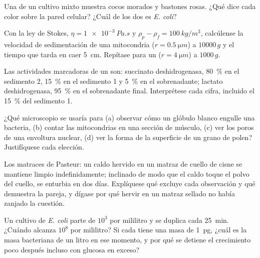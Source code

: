 \begin{exercise}[$\star\star$]\label{exo:b1:cell-unit-of-life:6}
Una  de un cultivo mixto muestra cocos morados y bastones
rosas. ¿Qué dice cada color sobre la pared celular? ¿Cuál de los dos es
\emph{E. coli}?
\end{exercise}

\begin{exercise}[$\star\star$]\label{exo:b1:cell-unit-of-life:7}
Con la ley de Stokes, $\eta = \qty{1e-3}{Pa.s}$ y $\rho_p - \rho_f =
\qty{100}{kg/m^3}$, calcúlense la velocidad de sedimentación de una
mitocondria ($r = \qty{0.5}{\micro m}$) a $\num{10000}\,g$ y el tiempo que
tarda en caer \qty{5}{cm}. Repítase para un 
($r = \qty{4}{\micro m}$) a $1000\,g$.
\end{exercise}

\begin{exercise}[$\star\star$]\label{exo:b1:cell-unit-of-life:8}
Las actividades marcadoras de un  son: succinato
deshidrogenasa, \qty{80}{\%} en el sedimento 2, \qty{15}{\%} en el
sedimento 1 y \qty{5}{\%} en el sobrenadante; lactato deshidrogenasa,
\qty{95}{\%} en el sobrenadante final. Interprétese cada cifra, incluido el
\qty{15}{\%} del sedimento 1.
\end{exercise}

\begin{exercise}[$\star\star$]\label{exo:b1:cell-unit-of-life:9}
¿Qué microscopio se usaría para (a) observar cómo un glóbulo blanco engulle
una bacteria, (b) contar las mitocondrias en una sección de músculo, (c) ver
los poros de una envoltura nuclear, (d) ver la forma de la superficie de un
grano de polen? Justifíquese cada elección.
\end{exercise}

\begin{exercise}[$\star\star\star$]\label{exo:b1:cell-unit-of-life:10}
Los matraces de Pasteur: un caldo hervido en un matraz de cuello de cisne se
mantiene limpio indefinidamente; inclinado de modo que el caldo toque el
polvo del cuello, se enturbia en dos días. Explíquese qué excluye cada
observación y qué demuestra la pareja, y dígase por qué hervir en un matraz
sellado no había zanjado la cuestión.
\end{exercise}

\begin{exercise}[$\star\star\star$]\label{exo:b1:cell-unit-of-life:11}
Un cultivo de \emph{E. coli} parte de $10^3$  por mililitro y se
duplica cada \qty{25}{min}. ¿Cuándo alcanza $10^8$ por mililitro? Si cada
 tiene una masa de \qty{1}{pg}, ¿cuál es la masa bacteriana de un
litro en ese momento, y por qué se detiene el crecimiento poco después
incluso con glucosa en exceso?
\end{exercise}

